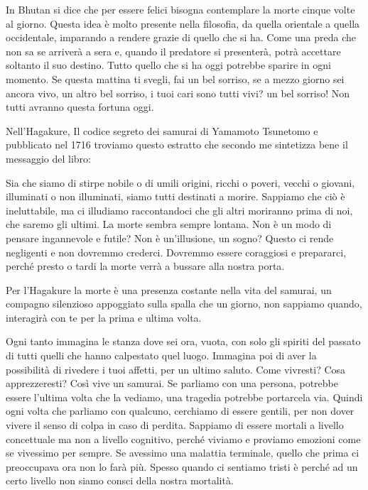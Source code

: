 \documentclass[12pt]{book} %
\begin{document}
In Bhutan si dice che per essere felici bisogna contemplare la morte cinque volte al giorno. Questa idea è molto
presente nella filosofia, da quella orientale a quella occidentale, imparando a rendere grazie di quello che si ha.
Come una preda che non sa se arriverà a sera e, quando il predatore si presenterà, potrà accettare soltanto il suo
destino. Tutto quello che si ha oggi potrebbe sparire in ogni momento. 
Se questa mattina ti svegli, fai un bel sorriso, se a mezzo giorno sei ancora vivo, un altro bel sorriso, i tuoi cari sono tutti vivi? un bel sorriso! Non tutti avranno questa fortuna oggi.

Nell'Hagakure, Il codice segreto dei samurai di Yamamoto Tsunetomo e pubblicato nel
1716 troviamo questo
estratto che secondo me sintetizza bene il messaggio del libro:

Sia che siamo di stirpe nobile o di umili origini, ricchi o poveri, vecchi o giovani, illuminati o non illuminati, siamo
tutti destinati a morire. Sappiamo che ciò è ineluttabile, ma ci illudiamo raccontandoci che gli altri moriranno prima
di noi, che saremo gli ultimi. La morte sembra sempre lontana. Non è un modo di pensare ingannevole e futile? Non è
un'illusione, un sogno? Questo ci rende negligenti e non dovremmo crederci. Dovremmo essere coraggiosi e prepararci,
perché presto o tardi la morte verrà a bussare alla nostra porta.

Per l'Hagakure la morte è una presenza costante nella vita del samurai, un compagno silenzioso
appoggiato sulla spalla che un giorno, non sappiamo quando, interagirà con te per la prima e ultima volta. 

Ogni tanto immagina le stanza dove sei ora, vuota, con solo gli spiriti del passato di tutti quelli che hanno calpestato quel luogo. 
Immagina poi di aver la possibilità di rivedere i tuoi affetti, per un ultimo saluto. Come vivresti? Cosa apprezzeresti?
Così vive un samurai. Se parliamo con una persona, potrebbe essere l'ultima volta che la vediamo, una tragedia potrebbe
portarcela via. Quindi ogni volta che parliamo con qualcuno, cerchiamo di essere gentili, per non dover vivere il
senso di colpa in caso di perdita.
Sappiamo di essere mortali a livello concettuale ma non a livello cognitivo, perché viviamo e proviamo emozioni come se
vivessimo per sempre. Se avessimo una malattia terminale, quello che prima ci preoccupava ora non lo farà più. Spesso
quando ci sentiamo tristi è perché ad un certo livello non siamo consci della nostra mortalità.
\end{document}
